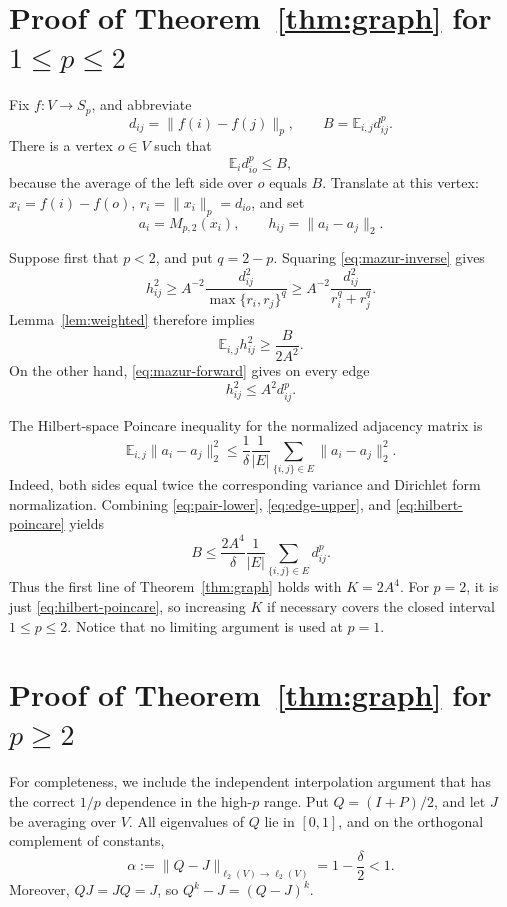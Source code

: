 \documentclass[11pt]{article}
\newcommand{\E}{\mathbb E}
\begin{document}
\section{Proof of Theorem~\ref{thm:graph} for
\texorpdfstring{$1\le p\le2$}{1 <= p <= 2}}

Fix $f:V\to S_p$, and abbreviate
\[
 d_{ij}=\|f(i)-f(j)\|_p,
 \qquad B=\E_{i,j}d_{ij}^p.
\]
There is a vertex $o\in V$ such that
\[
 \E_i d_{io}^p\le B,
\]
because the average of the left side over $o$ equals $B$.  Translate
at this vertex: $x_i=f(i)-f(o)$, $r_i=\|x_i\|_p=d_{io}$, and set
\[
 a_i=M_{p,2}(x_i),\qquad h_{ij}=\|a_i-a_j\|_2.
\]

Suppose first that $p<2$, and put $q=2-p$.  Squaring
\eqref{eq:mazur-inverse} gives
\[
 h_{ij}^2
 \ge A^{-2}\frac{d_{ij}^2}{\max\{r_i,r_j\}^{q}}
 \ge A^{-2}\frac{d_{ij}^2}{r_i^q+r_j^q}.
\]
Lemma~\ref{lem:weighted} therefore implies
\begin{equation}\label{eq:pair-lower}
 \E_{i,j}h_{ij}^2\ge\frac{B}{2A^2}.
\end{equation}
On the other hand, \eqref{eq:mazur-forward} gives on every edge
\begin{equation}\label{eq:edge-upper}
 h_{ij}^2\le A^2d_{ij}^p.
\end{equation}

The Hilbert-space Poincare inequality for the normalized adjacency matrix
is
\begin{equation}\label{eq:hilbert-poincare}
 \E_{i,j}\|a_i-a_j\|_2^2
 \le\frac1\delta\frac1{|E|}
       \sum_{\{i,j\}\in E}\|a_i-a_j\|_2^2.
\end{equation}
Indeed, both sides equal twice the corresponding variance and Dirichlet
form normalization.  Combining \eqref{eq:pair-lower},
\eqref{eq:edge-upper}, and \eqref{eq:hilbert-poincare} yields
\[
 B\le\frac{2A^4}{\delta}\frac1{|E|}
       \sum_{\{i,j\}\in E}d_{ij}^p.
\]
Thus the first line of Theorem~\ref{thm:graph} holds with $K=2A^4$.
For $p=2$, it is just \eqref{eq:hilbert-poincare}, so increasing $K$
if necessary covers the closed interval $1\le p\le2$.  Notice that no
limiting argument is used at $p=1$.

\section{Proof of Theorem~\ref{thm:graph} for
\texorpdfstring{$p\ge2$}{p >= 2}}

For completeness, we include the independent interpolation argument that
has the correct $1/p$ dependence in the high-$p$ range.  Put
$Q=(I+P)/2$, and let $J$ be averaging over $V$.  All eigenvalues of
$Q$ lie in $[0,1]$, and on the orthogonal complement of constants,
\[
 \alpha:=\|Q-J\|_{\ell_2(V)\to\ell_2(V)}=1-\frac\delta2<1.
\]
Moreover, $QJ=JQ=J$, so $Q^k-J=(Q-J)^k$.
\end{document}
